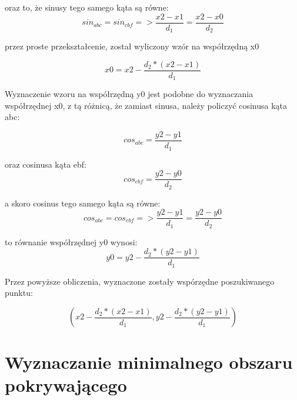 oraz to, że sinusy tego samego kąta są równe:
\begin{equation}
sin_{abc} = sin_{ebf} => \frac{x2 - x1}{d_1} = \frac{x2 - x0}{d_2}
\end{equation}\newline

przez proste przekształcenie, został wyliczony wzór na współrzędną x0

\begin{equation}
x0 = x2 - \frac{d_2*(x2 - x1)}{d_1}
\end{equation}\newline

Wyznaczenie wzoru na współrzędną y0 jest podobne do wyznaczania współrzędnej x0, z tą różnicą, że zamiast sinusa, należy policzyć cosinusa kąta abc:

\begin{equation}
cos_{abc} = \frac{y2 - y1}{d_1}
\end{equation}\newline

oraz cosinusa kąta ebf:
\begin{equation}
cos_{ebf} = \frac{y2 - y0}{d_2}
\end{equation}\newline

a skoro cosinus tego samego kąta są równe:
\begin{equation}
cos_{abc} = cos_{ebf} => \frac{y2 - y1}{d_1} = \frac{y2 - y0}{d_2}
\end{equation}\newline

to równanie współrzędnej y0 wynosi:
\begin{equation}
y0 = y2 - \frac{d_2*(y2 - y1)}{d_1}
\end{equation}\newline

Przez powyższe obliczenia, wyznaczone zostały wspórzędne poszukiwanego punktu:

\begin{equation} \label{eq:calculatedCoordinates}
(x2 - \frac{d_2*(x2 - x1)}{d_1}, y2 - \frac{d_2*(y2 - y1)}{d_1})
\end{equation}\newline

\newpage
\section{Wyznaczanie minimalnego obszaru pokrywającego}
\label{sec:Wyznaczanieminimalnegoobszarupokrywającego}

